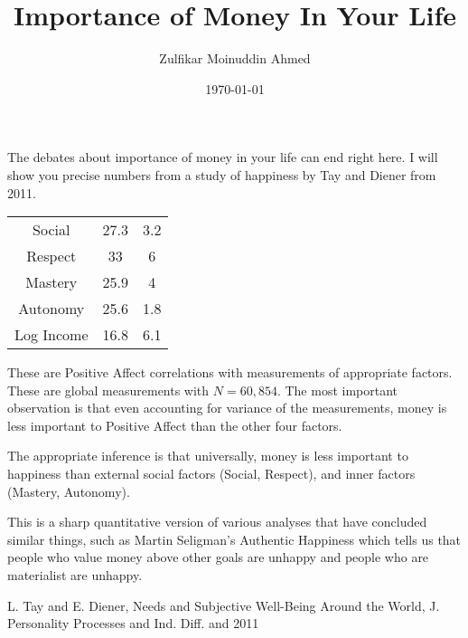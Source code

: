 \documentclass{amsart}
\title{Importance of Money In Your Life}
\author{Zulfikar Moinuddin Ahmed}
\date{\today}
\begin{document}
\maketitle
The debates about importance of money in your life can end right here.  I will show you precise numbers from a study of happiness by Tay and Diener from 2011.  

\begin{tabular}{ccc}
Social & 27.3 & 3.2\\
Respect & 33  & 6 \\
Mastery & 25.9 & 4\\
Autonomy & 25.6 & 1.8\\
Log Income & 16.8 & 6.1
\end{tabular}

These are Positive Affect correlations with measurements of appropriate factors.  These are global measurements with $N=60,854$.  The most important observation is that even accounting for variance of the measurements, money is less important to Positive Affect than the other four factors.

The appropriate inference is that universally, money is less important to happiness than external social factors (Social, Respect), and inner factors (Mastery, Autonomy).  

This is a sharp quantitative version of various analyses that have concluded similar things, such as Martin Seligman's Authentic Happiness which tells us that people who value money above other goals are unhappy and people who are materialist are unhappy.



\begin{thebibliography}{CCC}
\bibitem L. Tay and E. Diener,  Needs and Subjective Well-Being Around the World, J. Personality Processes and Ind. Diff.  and 2011
\end{thebibliography}
\end{document}
